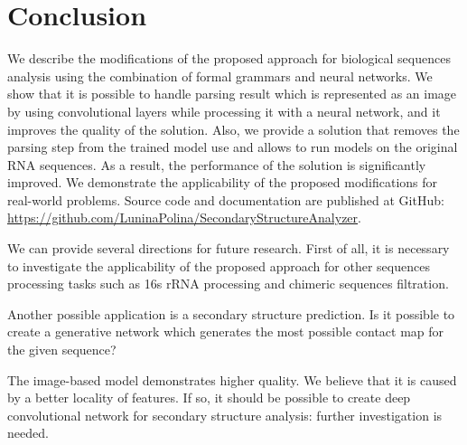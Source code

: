 \documentclass[runningheads]{llncs}
\begin{document}


\section{Conclusion}
We describe the modifications of the proposed approach for biological sequences analysis using the combination of formal grammars and neural networks.
We show that it is possible to handle parsing result which is represented as an image by using convolutional layers while processing it with a neural network, and it improves the quality of the solution.
Also, we provide a solution that removes the parsing step from the trained model use and allows to run models on the original RNA sequences.
As a result, the performance of the solution is significantly improved.
We demonstrate the applicability of the proposed modifications for real-world problems.
Source code and documentation are published at GitHub: \url{https://github.com/LuninaPolina/SecondaryStructureAnalyzer}.

We can provide several directions for future research.
First of all, it is necessary to investigate the applicability of the proposed approach for other sequences processing tasks such as 16s rRNA processing and chimeric sequences filtration.

Another possible application is a secondary structure prediction.
Is it possible to create a generative network which generates the most possible contact map for the given sequence?

The image-based model demonstrates higher quality.
We believe that it is caused by a better locality of features.
If so, it should be possible to create deep convolutional network for secondary structure analysis: further investigation is needed.
\end{document}
